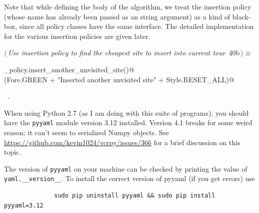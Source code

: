 \documentclass[11.5pt]{report}
\begin{document}
\vspace{-0.8cm}\newchunk Note that while defining the body of the algorithm, we treat the insertion policy 
(whose name has already been passed as an string argument) as a kind of black-box, since all 
policy classes have the same interface. The detailed implementation for the various 
insertion policies are given later. 

\begin{flushleft} \small\label{scrap49}\raggedright\small
{} $\langle\,${\itshape Use insertion policy to find the cheapest site to insert into current tour}\nobreak\ {\footnotesize {40b}}$\,\rangle\equiv$
\vspace{-1ex}
\begin{list}{}{} \item
\mbox{}\verb@insertion_policy.insert_another_unvisited_site()@\\
\mbox{}\verb@debug(Fore.GREEN + "Inserted another unvisited site" + Style.RESET_ALL)@\\
\mbox{}\verb@@{\NWsep}
\end{list}
\vspace{-1.5ex}
\footnotesize
\begin{list}{}{\setlength{\itemsep}{-\parsep}\setlength{\itemindent}{-\leftmargin}}
\item \NWtxtMacroRefIn\ .

\item{}
\end{list}
\vspace{4ex}
\end{flushleft}

\vspace{-0.8cm}\newchunk When using Python 2.7 (as I am doing with this suite of programs), you should have the 
\texttt{pyyaml} module version 3.12 installed. Version 4.1 breaks for some weird reason; it can't seem to serialized
Numpy objects. See \url{https://github.com/kevin1024/vcrpy/issues/366} for a brief discussion on this topic. 

The version of \verb|pyyaml| on your machine can be checked by printing the value of \verb|yaml.__version__|. 
To install the correct version of pyyaml (if you get errors)  use

\begin{verbatim} 
              sudo pip uninstall pyyaml && sudo pip install pyyaml=3.12
\end{verbatim}
\end{document}
